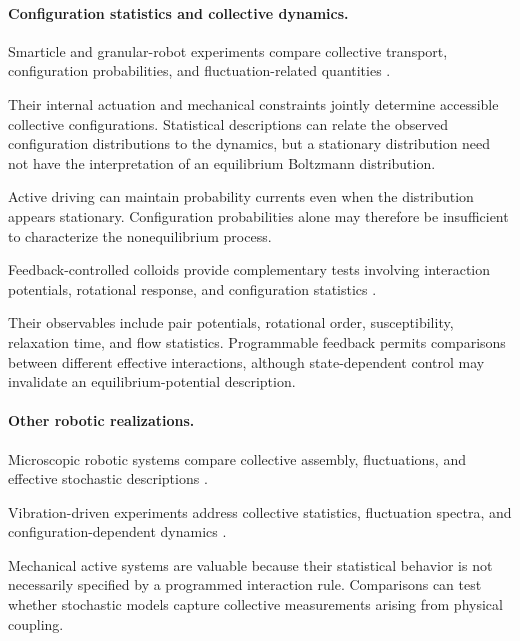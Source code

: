 \paragraph*{Configuration statistics and collective dynamics.}

Smarticle and granular-robot experiments
compare collective transport, configuration
probabilities, and fluctuation-related
quantities
\cite{Li2018supersmarticlealo,Chvykov2020lowrattlingapred,Li2020programmingactiveg}.

Their internal actuation and mechanical
constraints jointly determine accessible
collective configurations. Statistical
descriptions can relate the observed
configuration distributions to the dynamics,
but a stationary distribution need not
have the interpretation of an equilibrium
Boltzmann distribution.

Active driving can maintain probability
currents even when the distribution appears
stationary. Configuration probabilities
alone may therefore be insufficient
to characterize the nonequilibrium process.

Feedback-controlled colloids provide
complementary tests involving interaction
potentials, rotational response, and
configuration statistics
\cite{Yan2014colloidalsuperstruc,Buerle2020formationofstable,Knippenberg2022roleofcohesionin,Lffler2021behaviordependentc}.

Their observables include pair potentials,
rotational order, susceptibility,
relaxation time, and flow statistics.
Programmable feedback permits comparisons
between different effective interactions,
although state-dependent control may
invalidate an equilibrium-potential
description.

\paragraph*{Other robotic realizations.}

Microscopic robotic systems compare
collective assembly, fluctuations,
and effective stochastic descriptions
\cite{Yang2022emergentmicroroboti,Aubret2018targetedassemblyan,Raghavendra2026programmablepersist}.

Vibration-driven experiments address
collective statistics, fluctuation
spectra, and configuration-dependent
dynamics
\cite{Baconnier2022selectiveandcollec,Boudet2025nonmarkoviandynami,Mayya2019nonuniformrobotde,Zhang2024proteinfoldinginsp,Li2021programmingactivec}.

Mechanical active systems are valuable
because their statistical behavior is
not necessarily specified by a programmed
interaction rule. Comparisons can test
whether stochastic models capture
collective measurements arising
from physical coupling.

